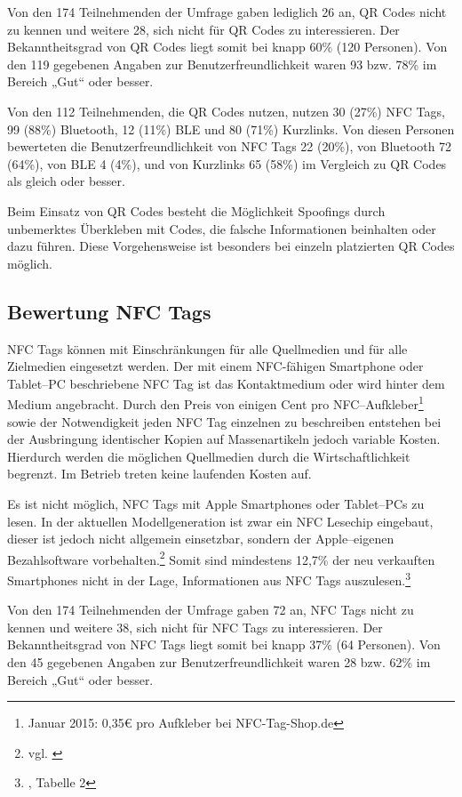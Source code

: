 Von den 174 Teilnehmenden der Umfrage gaben lediglich 26 an, QR Codes nicht zu kennen und weitere 28, sich nicht für QR Codes zu interessieren. Der Bekanntheitsgrad von QR Codes liegt somit bei knapp 60\% (120 Personen). Von den 119 gegebenen Angaben zur Benutzerfreundlichkeit waren 93 bzw. 78\% im Bereich „Gut“ oder besser.

Von den 112 Teilnehmenden, die QR Codes nutzen, nutzen 30 (27\%) NFC Tags, 99 (88\%) Bluetooth, 12 (11\%) \ac{BLE} und 80 (71\%) Kurzlinks. Von diesen Personen bewerteten die  Benutzerfreundlichkeit von NFC Tags 22 (20\%), von Bluetooth 72 (64\%), von \ac{BLE} 4 (4\%), und von Kurzlinks 65 (58\%) im Vergleich zu QR Codes als gleich oder besser.

Beim Einsatz von QR Codes besteht die Möglichkeit Spoofings durch unbemerktes Überkleben mit Codes, die falsche Informationen beinhalten oder dazu führen. Diese Vorgehensweise ist besonders bei einzeln platzierten QR Codes möglich. 

\subsection{Bewertung NFC Tags} %
\label{sub:bewertung_nfc_tags}
NFC Tags können mit Einschränkungen für alle Quellmedien und für alle Zielmedien eingesetzt werden. Der mit einem NFC-fähigen Smartphone oder Tablet–PC beschriebene NFC Tag ist das Kontaktmedium oder wird hinter dem Medium angebracht. Durch den Preis von einigen Cent pro NFC–Aufkleber\footnote{Januar 2015: 0,35€ pro Aufkleber bei NFC-Tag-Shop.de} sowie der Notwendigkeit jeden NFC Tag einzelnen zu beschreiben entstehen bei der Ausbringung identischer Kopien auf Massenartikeln jedoch variable Kosten. Hierdurch werden die möglichen Quellmedien durch die Wirtschaftlichkeit begrenzt. Im Betrieb treten keine laufenden Kosten auf.

Es ist nicht möglich, NFC Tags mit Apple Smartphones oder Tablet–PCs zu lesen. In der aktuellen Modellgeneration ist zwar ein NFC Lesechip eingebaut, dieser ist jedoch nicht allgemein einsetzbar, sondern der Apple–eigenen Bezahlsoftware vorbehalten.\footnote{vgl. \cite{zdnet:applenfc}}
Somit sind mindestens 12,7\% der neu verkauften Smartphones nicht in der Lage, Informationen aus NFC Tags auszulesen.\footnote{\cite{garnter:os}, Tabelle 2}

Von den 174 Teilnehmenden der Umfrage gaben 72 an, NFC Tags nicht zu kennen und weitere 38, sich nicht für NFC Tags zu interessieren. Der Bekanntheitsgrad von NFC Tags liegt somit bei knapp 37\% (64 Personen). Von den 45 gegebenen Angaben zur Benutzerfreundlichkeit waren 28 bzw. 62\% im Bereich „Gut“ oder besser. 

